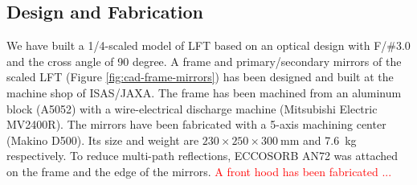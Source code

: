 \documentclass[journal]{IEEEtran}
\newcommand{\red}[1]{\textcolor{red}{#1}}
\begin{document}
\subsection{Design and Fabrication}
%
\par
We have built a 1/4-scaled model of LFT based on an optical design with F/\#3.0 and the cross angle of 90 degree. 
A frame and primary/secondary mirrors of the scaled LFT (Figure \ref{fig:cad-frame-mirrors}) has been designed and built at the machine shop of ISAS/JAXA.
The frame has been machined from an aluminum block (A5052) with a wire-electrical discharge machine (Mitsubishi Electric MV2400R).
The mirrors have been fabricated with a 5-axis machining center (Makino D500).
Its size and weight are $230 \times 250 \times 300 ~\mathrm{mm}$ and 7.6~kg respectively. To reduce multi-path reflections, ECCOSORB AN72 was attached on the frame and the edge of the mirrors.
\red{A front hood has been fabricated ...}
%
\end{document}

